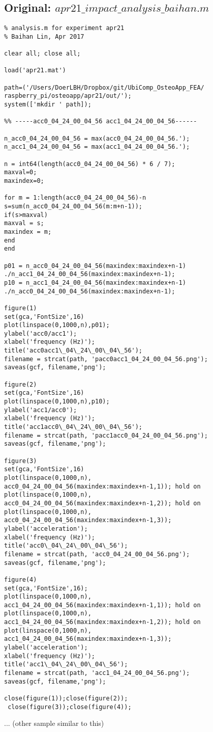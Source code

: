 \documentclass{sigchi}
\begin{document}
\subsection{Original: $apr21\_impact\_analysis\_baihan.m$}\label{ss:imp_ana.m}
\begin{lstlisting}
% analysis.m for experiment apr21 
% Baihan Lin, Apr 2017

clear all; close all;

load('apr21.mat')

path=('/Users/DoerLBH/Dropbox/git/UbiComp_OsteoApp_FEA/
raspberry_pi/osteoapp/apr21/out/');
system(['mkdir ' path]);

%% -----acc0_04_24_00_04_56 acc1_04_24_00_04_56------

n_acc0_04_24_00_04_56 = max(acc0_04_24_00_04_56.');
n_acc1_04_24_00_04_56 = max(acc1_04_24_00_04_56.');

n = int64(length(acc0_04_24_00_04_56) * 6 / 7);
maxval=0;
maxindex=0;

for m = 1:length(acc0_04_24_00_04_56)-n
s=sum(n_acc0_04_24_00_04_56(m:m+n-1));
if(s>maxval)
maxval = s;
maxindex = m;
end
end

p01 = n_acc0_04_24_00_04_56(maxindex:maxindex+n-1)
./n_acc1_04_24_00_04_56(maxindex:maxindex+n-1);
p10 = n_acc1_04_24_00_04_56(maxindex:maxindex+n-1)
./n_acc0_04_24_00_04_56(maxindex:maxindex+n-1);

figure(1)
set(gca,'FontSize',16)
plot(linspace(0,1000,n),p01);
ylabel('acc0/acc1');
xlabel('frequency (Hz)');
title('acc0acc1\_04\_24\_00\_04\_56');
filename = strcat(path, 'pacc0acc1_04_24_00_04_56.png');
saveas(gcf, filename,'png');

figure(2)
set(gca,'FontSize',16)
plot(linspace(0,1000,n),p10);
ylabel('acc1/acc0');
xlabel('frequency (Hz)');
title('acc1acc0\_04\_24\_00\_04\_56');
filename = strcat(path, 'pacc1acc0_04_24_00_04_56.png');
saveas(gcf, filename,'png');

figure(3)
set(gca,'FontSize',16)
plot(linspace(0,1000,n),
acc0_04_24_00_04_56(maxindex:maxindex+n-1,1)); hold on
plot(linspace(0,1000,n),
acc0_04_24_00_04_56(maxindex:maxindex+n-1,2)); hold on
plot(linspace(0,1000,n),
acc0_04_24_00_04_56(maxindex:maxindex+n-1,3));
ylabel('acceleration');
xlabel('frequency (Hz)');
title('acc0\_04\_24\_00\_04\_56');
filename = strcat(path, 'acc0_04_24_00_04_56.png');
saveas(gcf, filename,'png');

figure(4)
set(gca,'FontSize',16);
plot(linspace(0,1000,n),
acc1_04_24_00_04_56(maxindex:maxindex+n-1,1)); hold on
plot(linspace(0,1000,n),
acc1_04_24_00_04_56(maxindex:maxindex+n-1,2)); hold on
plot(linspace(0,1000,n),
acc1_04_24_00_04_56(maxindex:maxindex+n-1,3));
ylabel('acceleration');
xlabel('frequency (Hz)');
title('acc1\_04\_24\_00\_04\_56');
filename = strcat(path, 'acc1_04_24_00_04_56.png');
saveas(gcf, filename,'png');

close(figure(1));close(figure(2));
 close(figure(3));close(figure(4));
\end{lstlisting}
... (other sample similar to this)
\end{document}
